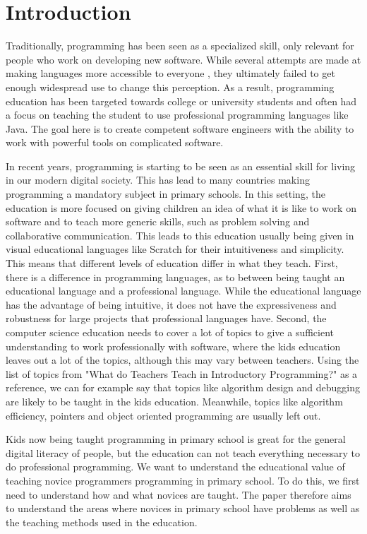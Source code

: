 \chapter{Introduction}
\label{chap:introduction}
Traditionally, programming has been seen as a specialized skill, only relevant for people who work on developing new software.
While several attempts are made at making languages more accessible to everyone , they ultimately failed to get enough widespread use to change this perception.
As a result, programming education has been targeted towards college or university students and often had a focus on teaching the student to use professional programming languages like Java\cite{tiobe}.
The goal here is to create competent software engineers with the ability to work with powerful tools on complicated software.

In recent years, programming is starting to be seen as an essential skill for living in our modern digital society.
This has lead to many countries making programming a mandatory subject in primary schools. In this setting, the education is more focused on giving children an idea of what it is like to work on software and to teach more generic skills, such as problem solving and collaborative communication. This leads to this education usually being given in visual educational languages like Scratch \cite{MaloneyResnick10} for their intuitiveness and simplicity. This means that different levels of education differ in what they teach.
First, there is a difference in programming languages, as to between being taught an educational language and a professional language. While the educational language has the advantage of being intuitive, it does not have the expressiveness and robustness for large projects that professional languages have.
Second, the computer science education needs to cover a lot of topics to give a sufficient understanding to work professionally with software, where the kids education leaves out a lot of the topics, although this may vary between teachers.
Using the list of topics from "What do Teachers Teach in Introductory Programming?"\cite{WhatDoTeach06} as a reference, we can for example say that topics like algorithm design and debugging are likely to be taught in the kids education. Meanwhile, topics like algorithm efficiency, pointers and object oriented programming are usually left out.

Kids now being taught programming in primary school is great for the general digital literacy of people, but the education can not teach everything necessary to do professional programming.
We want to understand the educational value of teaching novice programmers programming in primary school. To do this, we first need to understand how and what novices are taught. The paper therefore aims to understand the areas where novices in primary school have problems as well as the teaching methods used in the education.

